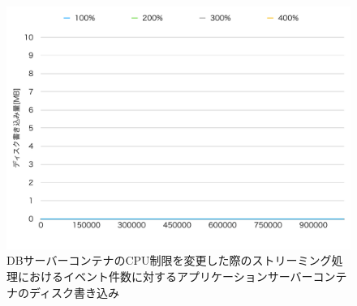 \documentclass[../../../../../main]{subfiles}
\begin{document}
    \begin{figure}[H]
        \centering
        \includegraphics[width=12cm]{graph}
        \caption{DBサーバーコンテナのCPU制限を変更した際のストリーミング処理におけるイベント件数に対するアプリケーションサーバーコンテナのディスク書き込み}
        \label{fig:stream-change-db-cpu-limit-app-disk-in-app_4_8192-db_1024}
    \end{figure}
\end{document}
